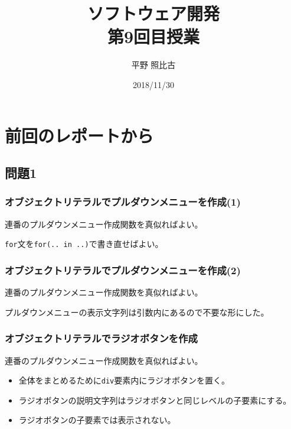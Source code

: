 
\title{ソフトウェア開発\\第9回目授業}
\author{平野 照比古}
\institute{}
\date{2018/11/30}
\newtheorem{Prob}{解説}
\newcommand{\Elm}[1]{\texttt{<#1>}}

\newcommand{\DOMM}{\texttt}
\newcommand{\Event}{\texttt}
\newcommand{\DOMP}{\texttt}
\newcommand{\DOM}{\texttt{DOM}}
\newcommand{\keyitem}{\relax}
\newcommand{\HTML}{HTML文書}

\frame{\maketitle}
\section{前回のレポートから}
\subsection{問題1}
 \begin{frame}[containsverbatim]
  \frametitle{オブジェクトリテラルでプルダウンメニューを作成(1)}
  連番のプルダウンメニュー作成関数を真似ればよい。

  \texttt{for}文を\texttt{for(.. in ..)}で書き直せばよい。
 \end{frame}
 \begin{frame}[containsverbatim]
  \frametitle{オブジェクトリテラルでプルダウンメニューを作成(2)}
  連番のプルダウンメニュー作成関数を真似ればよい。

  プルダウンメニューの表示文字列は引数内にあるので不要な形にした。
 \end{frame}
 \begin{frame}[containsverbatim]
  \frametitle{オブジェクトリテラルでラジオボタンを作成}
  連番のプルダウンメニュー作成関数を真似ればよい。

\begin{itemize}
 \item 全体をまとめるために\texttt{div}要素内にラジオボタンを置く。
 \item ラジオボタンの説明文字列はラジオボタンと同じレベルの子要素にする。
 \item ラジオボタンの子要素では表示されない。
\end{itemize}
 \end{frame}
